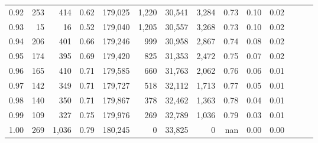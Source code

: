 \begin{tabular}{rrrrrrrrrrrrrr}
0.92 &    253 &    414 &  0.62 &  179,025 &    1,220 &  30,541 &   3,284 &  0.73 &  0.10 &      0.02 \\
0.93 &     15 &     16 &  0.52 &  179,040 &    1,205 &  30,557 &   3,268 &  0.73 &  0.10 &      0.02 \\
0.94 &    206 &    401 &  0.66 &  179,246 &      999 &  30,958 &   2,867 &  0.74 &  0.08 &      0.02 \\
0.95 &    174 &    395 &  0.69 &  179,420 &      825 &  31,353 &   2,472 &  0.75 &  0.07 &      0.02 \\
0.96 &    165 &    410 &  0.71 &  179,585 &      660 &  31,763 &   2,062 &  0.76 &  0.06 &      0.01 \\
0.97 &    142 &    349 &  0.71 &  179,727 &      518 &  32,112 &   1,713 &  0.77 &  0.05 &      0.01 \\
0.98 &    140 &    350 &  0.71 &  179,867 &      378 &  32,462 &   1,363 &  0.78 &  0.04 &      0.01 \\
0.99 &    109 &    327 &  0.75 &  179,976 &      269 &  32,789 &   1,036 &  0.79 &  0.03 &      0.01 \\
1.00 &    269 &  1,036 &  0.79 &  180,245 &        0 &  33,825 &       0 &   nan &  0.00 &      0.00 \\
\bottomrule
\end{tabular}

